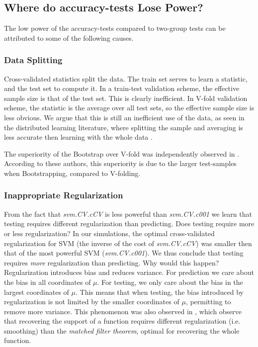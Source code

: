 \documentclass[]{bio}
\begin{document}
\subsection{Where do accuracy-tests Lose Power?}
The low power of the accuracy-tests compared to two-group tests can be attributed to some of the following causes.

\subsubsection{Data Splitting}
Cross-validated statistics split the data.
The train set serves to learn a statistic, and the test set to compute it.
In a train-test validation scheme, the effective sample size is that of the test set.
This is clearly inefficient. 
In V-fold validation scheme, the statistic is the average over all test sets, so the effective sample size is less obvious. 
We argue that this is still an inefficient use of the data, as seen in the distributed learning literature, where splitting the sample and averaging is less accurate then learning with the whole data \citep{rosenblatt2016optimality}.

The superiority of the Bootstrap over V-fold was independently observed in \cite{yu2007two}. 
According to these authors, this superiority is due to the larger test-samples when Bootstrapping, compared to V-folding.


\subsubsection{Inappropriate Regularization}
From the fact that \emph{svm.CV.cCV} is less powerful than \emph{svm.CV.c001} we learn that testing requires different regularization than predicting.
Does testing require more or less regularization?
In our simulations, the optimal cross-validated regularization for SVM (the inverse of the cost of \emph{svm.CV.cCV}) was smaller then that of the most powerful SVM (\emph{svm.CV.c001}).
We thus conclude that testing requires \emph{more} regularization  than predicting. 
Why would this happen?
Regularization introduces bias and reduces variance. 
For prediction we care about the bias in all coordinates of $\mu$. 
For testing, we only care about the bias in the largest coordinates of $\mu$. 
This means that when testing, the bias introduced by regularization is not limited by the smaller coordinates of $\mu$, permitting to remove more variance. 
This phenomenon was also observed in \cite{cheng2017multiple}, which observe that recovering the support of a function requires different regularization (i.e. smoothing) than the \emph{matched filter theorem}, optimal for recovering the whole function.
\end{document}
